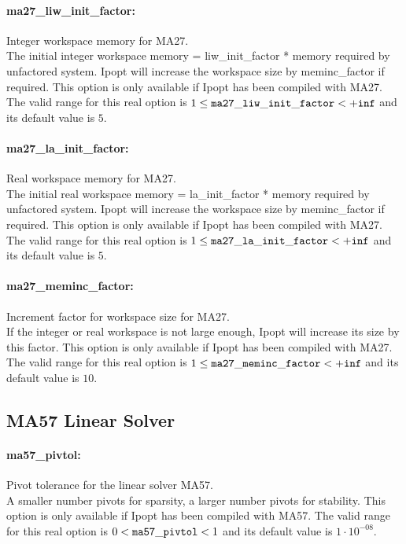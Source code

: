 \paragraph{ma27\_liw\_init\_factor:}\label{sec:ma27_liw_init_factor} Integer workspace memory for MA27. $\;$ \\
 The initial integer workspace memory =
liw\_init\_factor * memory required by unfactored
system. Ipopt will increase the workspace size by
meminc\_factor if required.  This option is only
available if Ipopt has been compiled with MA27. The valid range for this real option is 
$1 \le {\tt ma27\_liw\_init\_factor } <  {\tt +inf}$
and its default value is $5$.


\paragraph{ma27\_la\_init\_factor:}\label{sec:ma27_la_init_factor} Real workspace memory for MA27. $\;$ \\
 The initial real workspace memory =
la\_init\_factor * memory required by unfactored
system. Ipopt will increase the workspace size by
meminc\_factor if required.  This option is only
available if  Ipopt has been compiled with MA27. The valid range for this real option is 
$1 \le {\tt ma27\_la\_init\_factor } <  {\tt +inf}$
and its default value is $5$.


\paragraph{ma27\_meminc\_factor:}\label{sec:ma27_meminc_factor} Increment factor for workspace size for MA27. $\;$ \\
 If the integer or real workspace is not large
enough, Ipopt will increase its size by this
factor.  This option is only available if Ipopt
has been compiled with MA27. The valid range for this real option is 
$1 \le {\tt ma27\_meminc\_factor } <  {\tt +inf}$
and its default value is $10$.


\subsection{MA57 Linear Solver}

\paragraph{ma57\_pivtol:}\label{sec:ma57_pivtol} Pivot tolerance for the linear solver MA57. $\;$ \\
 A smaller number pivots for sparsity, a larger
number pivots for stability. This option is only
available if Ipopt has been compiled with MA57. The valid range for this real option is 
$0 <  {\tt ma57\_pivtol } <  1$
and its default value is $1 \cdot 10^{-08}$.


